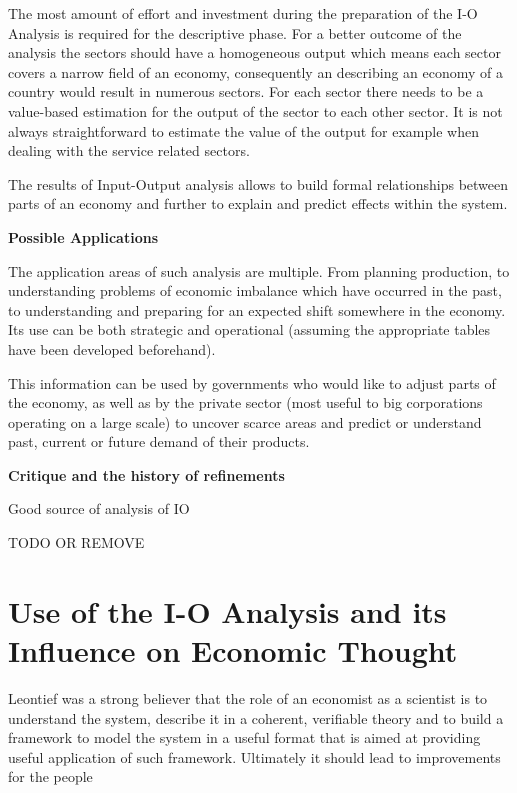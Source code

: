\documentclass[12pt,a4paper]{scrartcl}
\begin{document}
	The most amount of effort and investment during the preparation of the I-O Analysis is required for the descriptive phase. For a better outcome of the analysis the sectors should have a homogeneous output which means each sector covers a narrow field of an economy, consequently an describing an economy of a country would result in numerous sectors. For each sector there needs to be a value-based estimation for the output of the sector to each other sector. It is not always straightforward to estimate the value of the output for example when dealing with the service related sectors.
	
	The results of Input-Output analysis allows to build formal relationships between parts of an economy and further to explain and predict effects within the system. \cite[]{InvestopediaIO} \cite[pp.137-138]{christ1955review}
	
	\textbf{Possible Applications}
	
	The application areas of such analysis are multiple. From planning production, to understanding problems of economic imbalance which have occurred in the past, to understanding and preparing for an expected shift somewhere in the economy. Its use can be both strategic and operational (assuming the appropriate tables have been developed beforehand).
	
	This information can be used by governments who would like to adjust parts of the economy, as well as by the private sector (most useful to big corporations operating on a large scale) to uncover scarce areas and predict or understand past, current or future demand of their products.
	
	\textbf{Critique and the history of refinements}
	
	Good source of analysis of IO \cite{christ1955review}
	
	TODO OR REMOVE
	
	\section{Use of the I-O Analysis and its Influence on Economic Thought}  \label{contribution}
	
	Leontief was a strong believer that the role of an economist as a scientist is to understand the system, describe it in a coherent, verifiable theory and to build a framework to model the system in a useful format that is aimed at providing useful application of such framework. Ultimately it should lead to improvements for the people 
	
\end{document}
